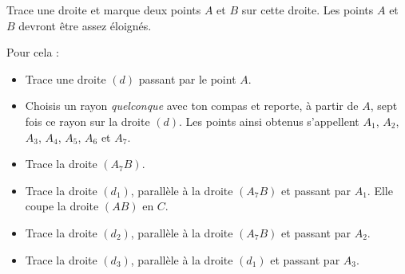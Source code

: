 Trace une droite et marque deux points $A$ et $B$ sur cette droite. Les
points $A$ et $B$ devront être assez éloignés.
\begin{quote}
  \begin{center}
  \end{center}
\end{quote}
Pour cela :
\begin{itemize}
\item Trace une droite $(d)$ passant par le point $A$.
\item Choisis un rayon {\em quelconque} avec ton compas et reporte, à
  partir de $A$, sept fois ce rayon sur la droite $(d)$. Les points
  ainsi obtenus s'appellent $A_1$, $A_2$, $A_3$, $A_4$, $A_5$, $A_6$
  et $A_7$.
\item Trace la droite $(A_7B)$.
\item Trace la droite $(d_1)$, parallèle à la droite $(A_7B)$ et
    passant par $A_1$. Elle coupe la droite $(AB)$ en $C$.
\item Trace la droite $(d_2)$, parallèle à la droite $(A_7B)$ et
    passant par $A_2$.
  \begin{quote}
  \end{quote}
\item Trace la droite $(d_3)$, parallèle à la droite $(d_1)$ et
  passant par $A_3$.
  \begin{quote}
\end{quote}
\end{itemize}
